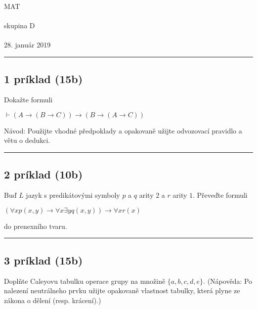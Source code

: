 \documentclass[11pt,a4paper]{article}
\begin{document}
\begin{center}
  \begin{bf}
    \Huge{MAT}\\[-0.5em]
    {\normalsize{}}\\[0.5em]

    \Large{skupina D}\\[-0.25em]
    {\normalsize{}}\\[1em]

    28. január 2019
  \end{bf}
\end{center}

\hrule

\subsection*{1 príklad (15b)}

  Dokažte formuli

  \begin{center}
    $\vdash (A \rightarrow (B \rightarrow C)) \rightarrow (B \rightarrow (A \rightarrow C))$
  \end{center}

  Návod: Použijte vhodné předpoklady a opakovaně užijte odvozovací pravidlo a větu o dedukci.\\

  \hrule

\subsection*{2 príklad (10b)}

  Buď $L$ jazyk s predikátovými symboly $p$ a $q$ arity $2$ a $r$ arity $1$. Převeďte formuli

  \begin{center}
    $(\forall x p(x,y) \rightarrow \forall x \exists y q(x,y)) \rightarrow \forall x r(x)$
  \end{center}

  do prenexního tvaru.\\

  \hrule

\subsection*{3 príklad (15b)}

  Doplňte Caleyovu tabulku operace grupy na množině $\{a,b,c,d,e\}$. (Nápověda: Po nalezení neutrálneho prvku užijte opakovaně vlastnost tabulky, která plyne ze zákona o dělení (resp. krácení).)
\end{document}
